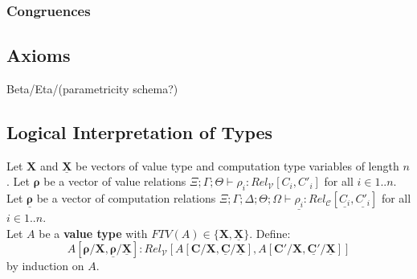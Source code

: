 \documentclass{article}
\begin{document}
\begin{prooftree}
\end{prooftree}

\subsubsection{Congruences}
\begin{prooftree}
\end{prooftree}
\subsection{Axioms}
Beta/Eta/(parametricity schema?)


\subsection{Logical Interpretation of Types}
Let $\bm{X}$ and $\bm{\underline{X}}$ be vectors of value type and computation type variables of length $n$.
Let $\bm{\rho}$ be a vector of value relations $\Xi ; \Gamma ; \Theta \vdash \rho_i : Rel_{\mathcal{V}}[C_i , C'_i]$ for all $i \in {1..n}$.
Let $\bm{\underline{\rho}}$ be a vector of computation relations $\Xi ; \Gamma ; \Delta ; \Theta ; \Omega \vdash \underline{\rho_i} : Rel_{\mathcal{C}}[\underline{C_i} , \underline{C'_i}]$ for all $i \in {1..n}$.
\\Let $A$ be a \textbf{value type} with $FTV(A) \in \{\bm{X},\bm{\underline{X}}\}$. Define:
\[
  A[\bm{\rho}/\bm{X},\bm{\underline{\rho}}/\bm{\underline{X}}] : Rel_{\mathcal{V}}[A[\bm{C}/\bm{X},\bm{\underline{C}}/\bm{\underline{X}}], A[\bm{C'}/\bm{X},\bm{\underline{C'}/\bm{\underline{X}}}]] 
\] 
by induction on $A$. 
\end{document}
